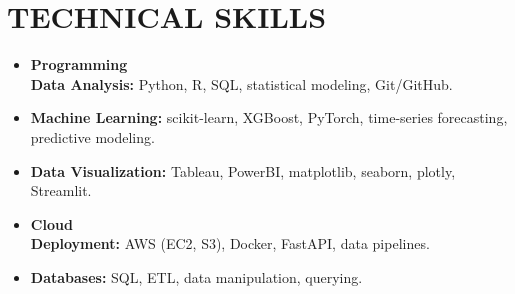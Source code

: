 \documentclass[a4paper,9pt]{extarticle}
\begin{document}
\section*{TECHNICAL SKILLS}

\begin{itemize}[leftmargin=0.5cm, label={}]
\item \textbf{Programming \\ Data Analysis:} Python, R, SQL, statistical modeling, Git/GitHub. \\

\item \textbf{Machine Learning:} scikit-learn, XGBoost, PyTorch, time-series forecasting, predictive modeling. \\

\item \textbf{Data Visualization:} Tableau, PowerBI, matplotlib, seaborn, plotly, Streamlit. \\

\item \textbf{Cloud \\ Deployment:} AWS (EC2, S3), Docker, FastAPI, data pipelines. \\

\item \textbf{Databases:} SQL, ETL, data manipulation, querying. \\
\end{itemize}
\end{document}
